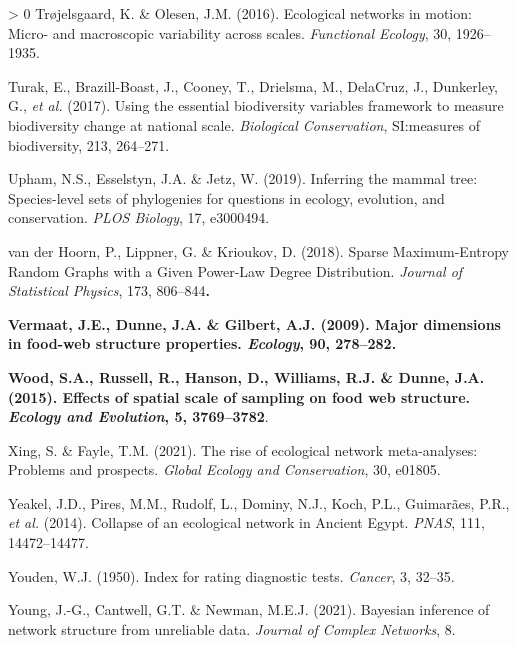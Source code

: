 \documentclass[11pt]{article}
\makeatletter
\def\maxwidth{\ifdim\Gin@nat@width>\linewidth\linewidth
\else\Gin@nat@width\fi}
\let\Oldincludegraphics\includegraphics
\renewcommand{\includegraphics}[1]{\Oldincludegraphics[width=\maxwidth]{#1}}
\newlength{\cslhangindent}
\newenvironment{CSLReferences}[3] %
 {%
  \setlength{\parindent}{0pt}
  \ifodd #1 \everypar{\setlength{\hangindent}{\cslhangindent}}\ignorespaces\fi
  \ifnum #2 > 0
  \setlength{\parskip}{#2\baselineskip}
  \fi
 }%
 {}
\providecommand{\DIFaddtex}[1]{{\bf #1}} %
\providecommand{\DIFaddbegin}{\protect\color{blue}} %
\providecommand{\DIFaddend}{\protect\color{black}} %
\providecommand{\DIFadd}[1]{\texorpdfstring{\DIFaddtex{#1}}{#1}} %
\newcommand{\DIFaddincludegraphics}[2][]{{\color{blue}\fbox{\DIFOincludegraphics[#1]{#2}}}} %
\DeclareRobustCommand{\DIFaddbegin}{\DIFOaddbegin \let\includegraphics\DIFaddincludegraphics} %
\DeclareRobustCommand{\DIFaddend}{\DIFOaddend \let\includegraphics\DIFOincludegraphics} %
\makeatother
\begin{document}
\begin{CSLReferences}{1}{0}
\leavevmode\hypertarget{ref-Trojelsgaard2016EcoNet}{}%
Trøjelsgaard, K. \& Olesen, J.M. (2016). Ecological networks in motion:
Micro- and macroscopic variability across scales. \emph{Functional
Ecology}, 30, 1926--1935.

\leavevmode\hypertarget{ref-Turak2017UsiEss}{}%
Turak, E., Brazill-Boast, J., Cooney, T., Drielsma, M., DelaCruz, J.,
Dunkerley, G., \emph{et al.} (2017). Using the essential biodiversity
variables framework to measure biodiversity change at national scale.
\emph{Biological Conservation}, SI:measures of biodiversity, 213,
264--271.

\leavevmode\hypertarget{ref-Upham2019InfMam}{}%
Upham, N.S., Esselstyn, J.A. \& Jetz, W. (2019). Inferring the mammal
tree: Species-level sets of phylogenies for questions in ecology,
evolution, and conservation. \emph{PLOS Biology}, 17, e3000494.

\leavevmode\hypertarget{ref-vanderHoorn2018SpaMax}{}%
van der Hoorn, P., Lippner, G. \& Krioukov, D. (2018). Sparse
Maximum-Entropy Random Graphs with a Given Power-Law Degree
Distribution. \emph{Journal of Statistical Physics}, 173, 806--844\DIFaddbegin \DIFadd{.
}

\leavevmode\hypertarget{ref-Vermaat2009MajDim}{}%
\DIFadd{Vermaat, J.E., Dunne, J.A. \& Gilbert, A.J. (2009). Major dimensions in
food-web structure properties. \emph{Ecology}, 90, 278--282.
}

\leavevmode\hypertarget{ref-Wood2015EffSpa}{}%
\DIFadd{Wood, S.A., Russell, R., Hanson, D., Williams, R.J. \& Dunne, J.A.
(2015). Effects of spatial scale of sampling on food web structure.
\emph{Ecology and Evolution}, 5, 3769--3782}\DIFaddend .

\leavevmode\hypertarget{ref-Xing2021RisEco}{}%
Xing, S. \& Fayle, T.M. (2021). The rise of ecological network
meta-analyses: Problems and prospects. \emph{Global Ecology and
Conservation}, 30, e01805.

\leavevmode\hypertarget{ref-Yeakel2014ColEco}{}%
Yeakel, J.D., Pires, M.M., Rudolf, L., Dominy, N.J., Koch, P.L.,
Guimarães, P.R., \emph{et al.} (2014). Collapse of an ecological network
in Ancient Egypt. \emph{PNAS}, 111, 14472--14477.

\leavevmode\hypertarget{ref-Youden1950IndRat}{}%
Youden, W.J. (1950). Index for rating diagnostic tests. \emph{Cancer},
3, 32--35.

\leavevmode\hypertarget{ref-Young2021BayInf}{}%
Young, J.-G., Cantwell, G.T. \& Newman, M.E.J. (2021). Bayesian
inference of network structure from unreliable data. \emph{Journal of
Complex Networks}, 8.


\end{CSLReferences}
\end{document}
